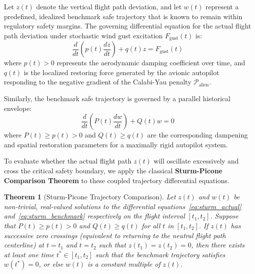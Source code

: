\documentclass[11pt,a4paper]{book}
\newtheorem{theorem}{Theorem}
\begin{document}
Let $z(t)$ denote the vertical flight path deviation, and let $w(t)$ represent a predefined, idealized benchmark safe trajectory that is known to remain within regulatory safety margins. The governing differential equation for the actual flight path deviation under stochastic wind gust excitation $F_{\text{gust}}(t)$ is:
\begin{equation}
\label{eq:sturm_actual}
\frac{d}{dt}\left( p(t) \frac{dz}{dt} \right) + q(t) z = F_{\text{gust}}(t)
\end{equation}
where $p(t) > 0$ represents the aerodynamic damping coefficient over time, and $q(t)$ is the localized restoring force generated by the avionic autopilot responding to the negative gradient of the Calabi-Yau penalty $\mathcal{P}_{\text{alien}}$.

Similarly, the benchmark safe trajectory is governed by a parallel historical envelope:
\begin{equation}
\label{eq:sturm_benchmark}
\frac{d}{dt}\left( P(t) \frac{dw}{dt} \right) + Q(t) w = 0
\end{equation}
where $P(t) \ge p(t) > 0$ and $Q(t) \ge q(t)$ are the corresponding dampening and spatial restoration parameters for a maximally rigid autopilot system.

To evaluate whether the actual flight path $z(t)$ will oscillate excessively and cross the critical safety boundary, we apply the classical \textbf{Sturm-Picone Comparison Theorem} to these coupled trajectory differential equations.

\begin{theorem}[Sturm-Picone Trajectory Comparison]
Let $z(t)$ and $w(t)$ be non-trivial, real-valued solutions to the differential equations~\eqref{eq:sturm_actual} and~\eqref{eq:sturm_benchmark} respectively on the flight interval $[t_1, t_2]$. Suppose that $P(t) \ge p(t) > 0$ and $Q(t) \ge q(t)$ for all $t$ in $[t_1, t_2]$. If $z(t)$ has successive zero crossings (equivalent to returning to the neutral flight path centerline) at $t = t_1$ and $t = t_2$ such that $z(t_1) = z(t_2) = 0$, then there exists at least one time $t^* \in [t_1, t_2]$ such that the benchmark trajectory satisfies $w(t^*) = 0$, or else $w(t)$ is a constant multiple of $z(t)$.
\end{theorem}
\end{document}
